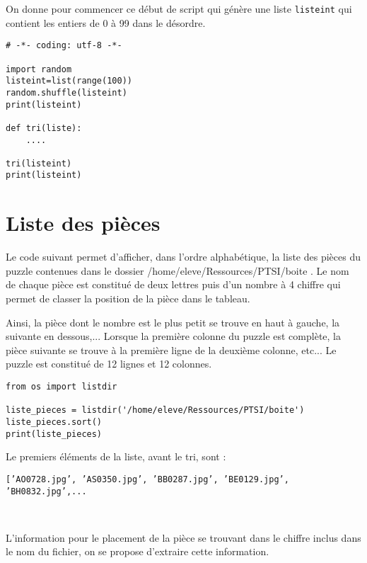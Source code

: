 On donne pour commencer ce début de script qui génère une liste \verb?listeint? qui contient les entiers de 0 à 99 dans le désordre.

\begin{verbatim}
# -*- coding: utf-8 -*-

import random
listeint=list(range(100))
random.shuffle(listeint)
print(listeint)

def tri(liste): 
	....

tri(listeint)
print(listeint)
\end{verbatim}


\section{Liste des pièces}

Le code suivant permet d'afficher, dans l'ordre alphabétique, la liste des pièces du puzzle contenues dans le dossier \og /home/eleve/Ressources/PTSI/boite \fg. Le nom de chaque pièce est constitué de deux lettres puis d'un nombre à 4 chiffre qui permet de classer la position de la pièce dans le tableau.

Ainsi, la pièce dont le nombre est le plus petit se trouve en haut à gauche, la suivante en dessous,... Lorsque la première colonne du puzzle est complète, la pièce suivante se trouve à la première ligne de la deuxième colonne, etc... Le puzzle est constitué de 12 lignes et 12 colonnes.

\begin{verbatim}
from os import listdir

liste_pieces = listdir('/home/eleve/Ressources/PTSI/boite')
liste_pieces.sort()
print(liste_pieces)
\end{verbatim}

Le premiers éléments de la liste, avant le tri, sont :

\texttt{['AO0728.jpg', 'AS0350.jpg', 'BB0287.jpg', 'BE0129.jpg', 'BH0832.jpg',...}

~\

L'information pour le placement de la pièce se trouvant dans le chiffre inclus dans le nom du fichier, on se propose d'extraire cette information.


